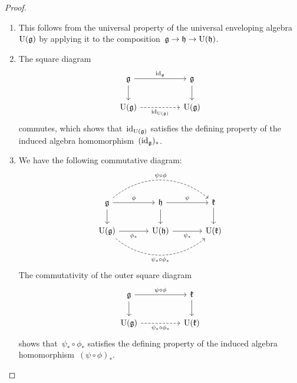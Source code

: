 \begin{proof}
  \leavevmode
  \begin{enumerate}
    \item
      This follows from the universal property of the universal enveloping algebra~$\operatorname{U}(\mathfrak{g})$ by applying it to the composition~$\mathfrak{g} \to \mathfrak{h} \to \operatorname{U}(\mathfrak{h})$.
    \item
      The square diagram
      \[
        \begin{tikzcd}[column sep = huge]
          \glie
          \arrow{r}[above]{\id_{\glie}}
          \arrow{d}
          &
          \glie
          \arrow{d}
          \\
          \Univ(\glie)
          \arrow[dashed]{r}[below]{\id_{\Univ(\glie)}}
          &
          \Univ(\glie)
        \end{tikzcd}
      \]
      commutes, which shows that~$\operatorname{id}_{\operatorname{U}(\mathfrak{g})}$ satisfies the defining property of the induced algebra homomorphism~$(\operatorname{id}_{\mathfrak{g}})_*$.
    \item
      We have the following commutative diagram:
      \[
        \begin{tikzcd}[column sep = large]
          \glie
          \arrow[dashed, bend left = 40]{rr}[above]{\psi \circ \phi}
          \arrow{r}[above]{\phi}
          \arrow{d}
          &
          \hlie
          \arrow{r}[above]{\psi}
          \arrow{d}
          &
          \klie
          \arrow{d}
          \\
          \Univ(\glie)
          \arrow{r}[below]{\phi_*}
          \arrow[dashed, bend right = 40]{rr}[below]{\psi_* \circ \phi_*}
          &
          \Univ(\hlie)
          \arrow{r}[below]{\psi_*}
          &
          \Univ(\klie)
        \end{tikzcd}
      \]
      The commutativity of the outer square diagram
      \[
        \begin{tikzcd}[column sep = huge]
          \glie
          \arrow{r}[above]{\psi \circ \phi}
          \arrow{d}
          &
          \klie
          \arrow{d}
          \\
          \Univ(\glie)
          \arrow[dashed]{r}[below]{\psi_* \circ \phi_*}
          &
          \Univ(\klie)
        \end{tikzcd}
      \]
      shows that~$\psi_* \circ \phi_*$ satisfies the defining property of the induced algebra homomorphism~$(\psi \circ \phi)_*$.
    \qedhere
  \end{enumerate}
\end{proof}





